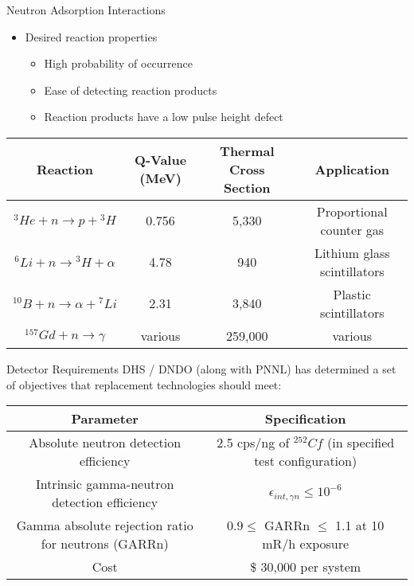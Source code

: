 \begin{frame}{Neutron Adsorption Interactions}
\begin{itemize}
	\item Desired reaction properties
	\begin{itemize}
		\item High probability of occurrence
		\item Ease of detecting reaction products
		\item Reaction products have a low pulse height defect
	\end{itemize}
\end{itemize}
\begin{table}
	\tiny
	\begin{tabular}{ c | c c c} 
		Reaction                           & Q-Value (MeV) & Thermal Cross Section & Application \\
		\hline
		\hline
		${}^3He + n \to p +{}^3H$          & 0.756     & 5,330 & Proportional counter gas \\
		${}^6Li + n \to {}^3H + \alpha$    & 4.78      & 940 & Lithium glass scintillators \\
		${}^{10}B + n \to \alpha + {}^7Li$ & 2.31      & 3,840 & Plastic scintillators \\
		${}^{157}Gd + n \to \gamma$        &various    & 259,000 & various \\
	\end{tabular}
\end{table}
\end{frame}


\begin{frame}{Detector Requirements}
DHS / DNDO (along with PNNL) has determined a set of objectives that replacement technologies should meet:
\begin{table}
	\tiny
	\begin{tabular}{c c }
	Parameter & Specification \\
	\hline
	\hline
	Absolute neutron detection efficiency & 2.5 cps/ng of ${}^{252}Cf$ (in specified test configuration) \\
	Intrinsic gamma-neutron detection efficiency & $ \epsilon_{int,\gamma n}\leq 10^{-6}$ \\
	Gamma absolute rejection ratio for neutrons (GARRn) & $ 0.9 \leq \text{ GARRn }\leq$ 1.1 at 10 mR/h exposure \\
	Cost &  \$ 30,000 per system \\
	\hline
	\end{tabular}
\end{table}
\end{frame}


